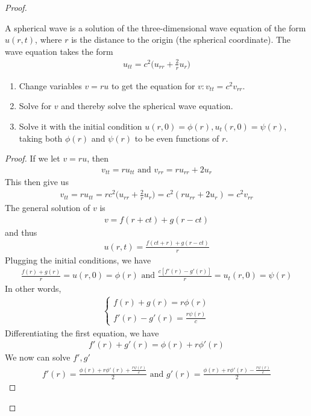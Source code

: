 \documentclass{report}
\begin{document}
\begin{proof}
\begin{question}{}{}
A spherical wave is a solution of the three-dimensional wave equation of the form $u(r,t)$, where $r$ is the distance to the origin (the spherical coordinate). The wave equation takes the form 
\begin{align*}
u_{tt}=c^2 \Big(u_{rr}+ \frac{2}{r}u_r \Big)
\end{align*}
\begin{enumerate}[label=(\alph*)]
  \item Change variables $v=ru$ to get the equation for $v:v_{tt}=c^2v_{rr}$. 
  \item Solve for $v$ and thereby solve the spherical wave equation. 
  \item Solve it with the initial condition $u(r,0)=\phi (r),u_t(r,0)= \psi (r)$, taking both $\phi (r)$ and $\psi (r)$ to be even functions of $r$. 
\end{enumerate}
\end{question}
\begin{proof}
If we let $v=ru$, then 
 \begin{align*}
v_{tt}=ru_{tt}\text{ and }v_{rr}=ru_{rr}+2u_r
\end{align*}
This then give us 
\begin{align*}
v_{tt}=ru_{tt}=rc^2\Big(u_{rr}+\frac{2}{r}u_r \Big)=c^2(ru_{rr}+2u_r)=c^2v_{rr}
\end{align*}
The general solution of $v$ is 
\begin{align*}
v=f(r+ct)+g(r-ct)
\end{align*}
and thus 
\begin{align*}
u(r,t)= \frac{f(ct+r)+g(r-ct)}{r}
\end{align*}
Plugging the initial conditions, we have 
\begin{align*}
\frac{f(r)+g(r)}{r}=u(r,0)=\phi (r)\text{ and }\frac{c[f'(r)-g'(r)]}{r}=u_t(r,0)=\psi (r)
\end{align*}
In other words, 
\begin{align*}
\begin{cases}
  f(r)+g(r)=r\phi (r)\\
  f'(r)-g'(r)=\frac{r \psi (r)}{c}
\end{cases}
\end{align*}
Differentiating the first equation, we have  
\begin{align*}
  f'(r)+g'(r)= \phi (r)+r\phi'(r)
\end{align*}
We now can solve $f',g'$ 
\begin{align*}
f'(r)= \frac{\phi (r)+r\phi '(r)+ \frac{r\psi (r)}{c}}{2}\text{ and }g'(r)= \frac{\phi (r)+r\phi'(r)- \frac{r\psi (r)}{c}}{2}

\end{align*}
\end{proof}
\end{proof}
\end{document}
